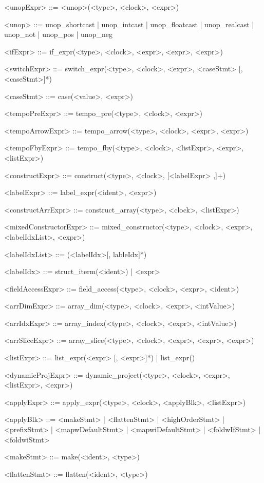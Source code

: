 \documentclass{article}
\begin{document}
\begin{grammar}
<unopExpr> ::= <unop>(<type>, <clock>, <expr>)

<unop> ::= unop_shortcast | unop_intcast | unop_floatcast |
           unop_realcast | unop_not | unop_pos | unop_neg

<ifExpr> ::= if_expr(<type>, <clock>, <expr>, <expr>, <expr>)

<switchExpr> ::= switch_expr(<type>, <clock>, <expr>, <caseStmt> [,<caseStmt>]*)

<caseStmt> ::= case(<value>, <expr>)

<tempoPreExpr> ::= tempo_pre(<type>, <clock>, <expr>)

<tempoArrowExpr> ::= tempo_arrow(<type>, <clock>, <expr>, <expr>)

<tempoFbyExpr> ::= tempo_fby(<type>, <clock>, <listExpr>, <expr>, <listExpr>)

<constructExpr> ::= construct(<type>, <clock>, [<labelExpr> ,]+)

<labelExpr> ::= label_expr(<ident>, <expr>)

<constructArrExpr> ::= construct_array(<type>, <clock>, <listExpr>)

<mixedConstructorExpr> ::= mixed_constructor(<type>, <clock>, <expr>, <labelIdxList>, <expr>)

<labelIdxList> ::= (<labelIdx>[, lableIdx]*)

<labelIdx> ::= struct_iterm(<ident>) | <expr>

<fieldAccessExpr> ::= field_access(<type>, <clock>, <expr>, <ident>)

<arrDimExpr> ::= array_dim(<type>, <clock>, <expr>, <intValue>)

<arrIdxExpr> ::= array_index(<type>, <clock>, <expr>, <intValue>)

<arrSliceExpr> ::= array_slice(<type>, <clock>, <expr>, <expr>, <expr>)

<listExpr> ::= list_expr(<expr> [, <expr>]*) | list_expr()

<dynamicProjExpr> ::= dynamic_project(<type>, <clock>, <expr>, <listExpr>, <expr>)

<applyExpr> ::= apply_expr(<type>, <clock>, <applyBlk>, <listExpr>)

<applyBlk> ::= <makeStmt> | <flattenStmt> | <highOrderStmt> | <prefixStmt> |
               <mapwDefaultStmt> | <mapwiDefaultStmt> |
               <foldwIfStmt> | <foldwiStmt>

<makeStmt> ::= make(<ident>, <type>)

<flattenStmt> ::= flatten(<ident>, <type>)


\end{grammar}
\end{document}
